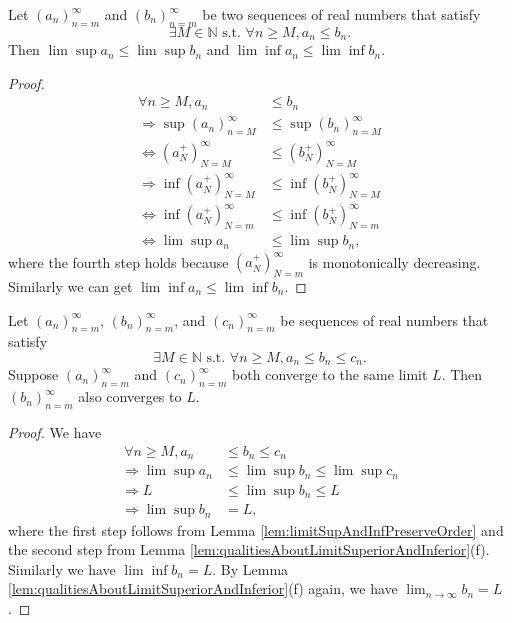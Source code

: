 \begin{lem}
  \label{lem:limitSupAndInfPreserveOrder}
  Let $(a_{n})_{n=m}^{\infty}$ and $(b_{n})_{n=m}^{\infty}$
  be two sequences of real numbers that satisfy
  \begin{displaymath}
    \exists M\in \mathbb{N} \text{ s.t. }
    \forall n\ge M, a_{n}\le b_{n}.
  \end{displaymath}
  Then $\lim\sup a_{n}\le \lim\sup b_{n}$
  and $\lim\inf a_{n}\le \lim\inf b_{n}$.
\end{lem}
\begin{proof}
  \begin{align*}
    \forall n\ge M, a_{n}&\le b_{n}\\
    \Rightarrow
    \sup(a_{n})_{n=M}^{\infty}&\le \sup(b_{n})_{n=M}^{\infty}\\
    \Leftrightarrow
    (a_{N}^{+})_{N=M}^{\infty}&\le (b_{N}^{+})_{N=M}^{\infty}\\
    \Rightarrow
    \inf(a_{N}^{+})_{N=M}^{\infty}&\le \inf(b_{N}^{+})_{N=M}^{\infty}\\
    \Leftrightarrow
    \inf(a_{N}^{+})_{N=m}^{\infty}&\le \inf(b_{N}^{+})_{N=m}^{\infty}\\
    \Leftrightarrow
    \lim\sup a_{n}&\le \lim\sup b_{n},
  \end{align*}
  where the fourth step holds because
  $(a_{N}^{+})_{N=m}^{\infty}$ is monotonically decreasing.
  Similarly we can get $\lim\inf a_{n}\le \lim\inf b_{n}$.
\end{proof}

\begin{thm}
  \label{thm:squeezeTest}
  Let $(a_n)_{n=m}^{\infty}$, $(b_n)_{n=m}^{\infty}$,
  and $(c_n)_{n=m}^{\infty}$ be sequences of real numbers
  that satisfy
  \begin{displaymath}
    \exists M\in \mathbb{N} \text{ s.t. }
    \forall n\ge M, a_n\le b_n \le c_n.
  \end{displaymath}
  Suppose $(a_n)_{n=m}^{\infty}$ and $(c_n)_{n=m}^{\infty}$
  both converge to the same limit $L$.
  Then $(b_n)_{n=m}^{\infty}$ also converges to $L$.
\end{thm}
\begin{proof}
  We have
  \begin{align*}
    \ \forall n\ge M, a_{n}&\le b_{n}\le c_{n} \\ 
    \Rightarrow
    \lim\sup a_{n}&\le \lim\sup b_{n}\le \lim\sup c_{n}\\
    \Rightarrow
    L&\le \lim\sup b_{n}\le L\\
    \Rightarrow
    \lim\sup b_{n}&=L,
  \end{align*}
  where the first step follows from
  Lemma \ref{lem:limitSupAndInfPreserveOrder} and the second step from
  Lemma \ref{lem:qualitiesAboutLimitSuperiorAndInferior}(f).
  Similarly we have $\lim\inf b_{n}=L.$ By Lemma
  \ref{lem:qualitiesAboutLimitSuperiorAndInferior}(f) again,
  we have $\lim_{n\rightarrow \infty}b_{n}=L$.
\end{proof}

